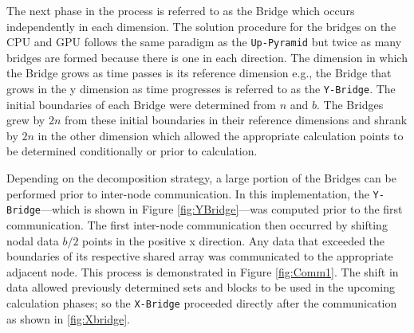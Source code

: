 \documentclass[review]{elsarticle}
\def\Up{\texttt{Up-Pyramid}}
\def\Xb{\texttt{X-Bridge}}
\def\Yb{\texttt{Y-Bridge}}
\begin{document}
\par The next phase in the process is referred to as the Bridge which occurs independently in each dimension. The solution procedure for the bridges on the CPU and GPU follows the same paradigm as the \Up{} but twice as many bridges are formed because there is one in each direction. The dimension in which the Bridge grows as time passes is its reference dimension e.g., the Bridge that grows in the y dimension as time progresses is referred to as the \Yb{}. The initial boundaries of each Bridge were determined from $n$ and $b$. The Bridges grew by $2n$ from these initial boundaries in their reference dimensions and shrank by $2n$ in the other dimension which allowed the appropriate calculation points to be determined conditionally or prior to calculation.

\par
Depending on the decomposition strategy, a large portion of the Bridges can be performed prior to inter-node communication. In this implementation, the \Yb{}---which is shown in Figure \ref{fig:YBridge}---was computed prior to the first communication. The first inter-node communication then occurred by shifting nodal data $b/2$ points in the positive x direction. Any data that exceeded the boundaries of its respective shared array was communicated to the appropriate adjacent node. This process is demonstrated in Figure \ref{fig:Comm1}. The shift in data allowed previously determined sets and blocks to be used in the upcoming calculation phases; so the \Xb{} proceeded directly after the communication as shown in \ref{fig:Xbridge}.
\end{document}
